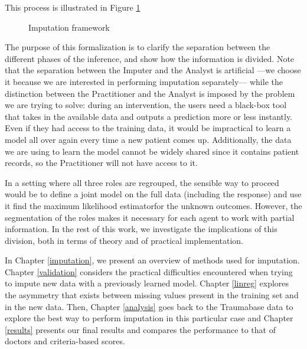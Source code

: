 This process is illustrated in Figure \ref{fig.tikz_imp}

\begin{figure}[H]
  \caption{Imputation framework}
  \label{fig.tikz_imp}
\end{figure}

The purpose of this formalization is to clarify the separation between the different phases of the inference, and show how the information is divided. Note that the separation between the Imputer and the Analyst is artificial ---we choose it because we are interested in performing imputation separately--- while the distinction between the Practitioner and the Analyst is imposed by the problem we are trying to solve: during an intervention, the users need a black-box tool that takes in the available data and outputs a prediction more or less instantly. Even if they had access to the training data, it would be impractical to learn a model all over again every time a new patient comes up. Additionally, the data we are using to learn the model cannot be widely shared since it contains patient records, so the Practitioner will not have access to it.

In a setting where all three roles are regrouped, the sensible way to proceed would be to define a joint model on the full data (including the response) and use it find the maximum likelihood estimatorfor the unknown outcomes. However, the segmentation of the roles makes it necessary for each agent to work with partial information. In the rest of this work, we investigate the implications of this division, both in terms of theory and of practical implementation.

In Chapter \ref{imputation}, we present an overview of methods used for imputation. Chapter \ref{validation} considers the practical difficulties encountered when trying to impute new data with a previously learned model. Chapter \ref{linreg} explores the asymmetry that exists between missing values present in the training set and in the new data. Then, Chapter \ref{analysis} goes back to the Traumabase data to explore the best way to perform imputation in this particular case and Chapter \ref{results} presents our final results and compares the performance to that of doctors and criteria-based scores.